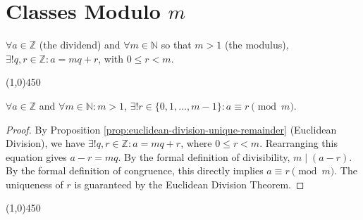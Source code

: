 \section{Classes Modulo \texorpdfstring{$m$}{m}}

\begin{proposition}
\label{prop:euclidean-division-unique-remainder}
$\forall a \in \mathbb{Z}$ (the dividend) and $\forall m \in \mathbb{N}$ so that $m > 1$ (the modulus), $\exists! q, r \in \mathbb{Z} : a = mq + r$, with $0 \leq r < m$.
\end{proposition}

\begin{center}
    \vspace{10pt}
    \line(1,0){450}
    \vspace{25pt}
\end{center}

\begin{theorem}
$\forall a \in \mathbb{Z}$ and $\forall m \in \mathbb{N} : m > 1$, $\exists! r \in \{0, 1, \dots, m-1\} : a \equiv r \pmod{m}$.
\end{theorem}
\begin{proof}
By Proposition \ref{prop:euclidean-division-unique-remainder} (Euclidean Division), we have $\exists! q, r \in \mathbb{Z} : a = mq + r$, where $0 \leq r < m$.
Rearranging this equation gives $a - r = mq$.
By the formal definition of divisibility, $m \mid (a - r)$.
By the formal definition of congruence, this directly implies $a \equiv r \pmod{m}$. The uniqueness of $r$ is guaranteed by the Euclidean Division Theorem. \qedhere
\end{proof}

\begin{center}
    \vspace{10pt}
    \line(1,0){450}
    \vspace{25pt}
\end{center}

